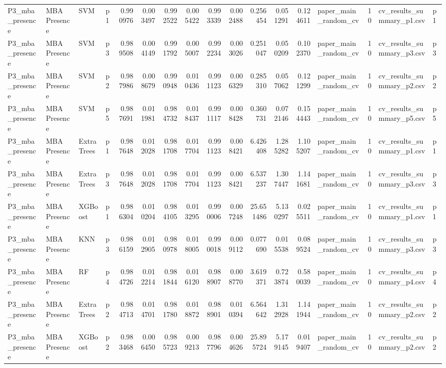 \begin{tabular}{llllrrrrrrrrrlrll}
P3_mba_presence & MBA Presence & SVM & p1 & 0.990976 & 0.003497 & 0.992522 & 0.005422 & 0.993339 & 0.002488 & 0.256454 & 0.051291 & 0.124611 & paper_main_random_cv & 10 & cv_results_summary_p1.csv & p1 \\
P3_mba_presence & MBA Presence & SVM & p3 & 0.989508 & 0.004149 & 0.991792 & 0.005007 & 0.992234 & 0.003026 & 0.251047 & 0.050209 & 0.102370 & paper_main_random_cv & 10 & cv_results_summary_p3.csv & p3 \\
P3_mba_presence & MBA Presence & SVM & p2 & 0.987986 & 0.008679 & 0.990948 & 0.010436 & 0.991123 & 0.006329 & 0.285310 & 0.057062 & 0.121299 & paper_main_random_cv & 10 & cv_results_summary_p2.csv & p2 \\
P3_mba_presence & MBA Presence & SVM & p5 & 0.987691 & 0.011981 & 0.984732 & 0.018437 & 0.991117 & 0.008428 & 0.360731 & 0.072146 & 0.154443 & paper_main_random_cv & 10 & cv_results_summary_p5.csv & p5 \\
P3_mba_presence & MBA Presence & ExtraTrees & p1 & 0.987648 & 0.012028 & 0.981708 & 0.017704 & 0.991123 & 0.008421 & 6.426408 & 1.285282 & 1.105207 & paper_main_random_cv & 10 & cv_results_summary_p1.csv & p1 \\
P3_mba_presence & MBA Presence & ExtraTrees & p3 & 0.987648 & 0.012028 & 0.981708 & 0.017704 & 0.991123 & 0.008421 & 6.537237 & 1.307447 & 1.141681 & paper_main_random_cv & 10 & cv_results_summary_p3.csv & p3 \\
P3_mba_presence & MBA Presence & XGBoost & p1 & 0.986304 & 0.010204 & 0.984105 & 0.013295 & 0.990006 & 0.007248 & 25.651486 & 5.130297 & 0.025511 & paper_main_random_cv & 10 & cv_results_summary_p1.csv & p1 \\
P3_mba_presence & MBA Presence & KNN & p3 & 0.986159 & 0.012905 & 0.980978 & 0.018005 & 0.990018 & 0.009112 & 0.077690 & 0.015538 & 0.089524 & paper_main_random_cv & 10 & cv_results_summary_p3.csv & p3 \\
P3_mba_presence & MBA Presence & RF & p4 & 0.984726 & 0.012214 & 0.981844 & 0.016120 & 0.988907 & 0.008770 & 3.619371 & 0.723874 & 0.580039 & paper_main_random_cv & 10 & cv_results_summary_p4.csv & p4 \\
P3_mba_presence & MBA Presence & ExtraTrees & p2 & 0.984713 & 0.014701 & 0.981780 & 0.018872 & 0.988901 & 0.010394 & 6.564642 & 1.312928 & 1.141944 & paper_main_random_cv & 10 & cv_results_summary_p2.csv & p2 \\
P3_mba_presence & MBA Presence & XGBoost & p2 & 0.983468 & 0.006450 & 0.985723 & 0.009213 & 0.987796 & 0.004626 & 25.895724 & 5.179145 & 0.019407 & paper_main_random_cv & 10 & cv_results_summary_p2.csv & p2 \\

\end{tabular}

